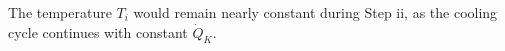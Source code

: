 The temperature \( T_i \) would remain nearly constant during Step ii, as the cooling cycle continues with constant \( \dot{Q}_K \).